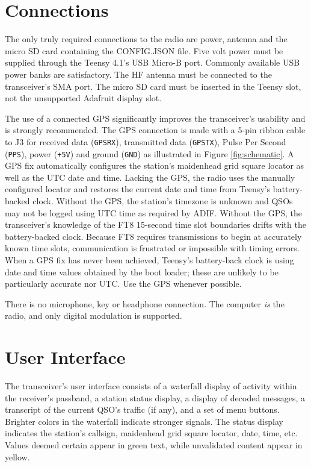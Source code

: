 \documentclass[10pt, letterpaper,]{article}
\begin{document}
\section*{Connections}
The only truly required connections to the radio are power, antenna and the micro SD card containing the CONFIG.JSON file.
Five volt power must be supplied through the Teensy 4.1's USB Micro-B port.
Commonly available USB power banks are satisfactory.
The HF antenna must be connected to the transceiver's SMA port.
The micro SD card must be inserted in the Teensy slot, not the unsupported Adafruit display slot.

The use of a connected GPS significantly improves the transceiver's usability and is strongly recommended.
The GPS connection is made with a 5-pin ribbon cable to J3 for received data (\texttt{GPSRX}), transmitted data (\texttt{GPSTX}), Pulse Per Second (\texttt{PPS}), power (\texttt{+5V}) and ground (\texttt{GND}) as illustrated in Figure \ref{fig:schematic}.
A GPS fix automatically configures the station's maidenhead grid square locator as well as the UTC date and time.
Lacking the GPS, the radio uses the manually configured locator and restores the current date and time from Teensy's battery-backed clock.
Without the GPS, the station's timezone is unknown and QSOs may not be logged using UTC time as required by ADIF.
Without the GPS, the transceiver's knowledge of the FT8 15-second time slot boundaries drifts with the battery-backed clock.
Because FT8 requires transmissions to begin at accurately known time slots, communication is frustrated or impossible with timing errors.
When a GPS fix has never been achieved, Teensy's battery-back clock is using date and time values obtained by the boot loader; these are unlikely to be particularly accurate nor UTC.
Use the GPS whenever possible.

There is no microphone, key or headphone connection.
The computer \emph{is} the radio, and only digital modulation is supported.

\section*{User Interface}
The transceiver's user interface consists of a waterfall display of activity within the receiver's passband, a station status display, a display of decoded messages, a transcript of the current QSO's traffic (if any), and a set of menu buttons.
Brighter colors in the waterfall indicate stronger signals.
The status display indicates the station's callsign, maidenhead grid square locator, date, time, etc.
Values deemed certain appear in green text, while unvalidated content appear in yellow.
\end{document}
